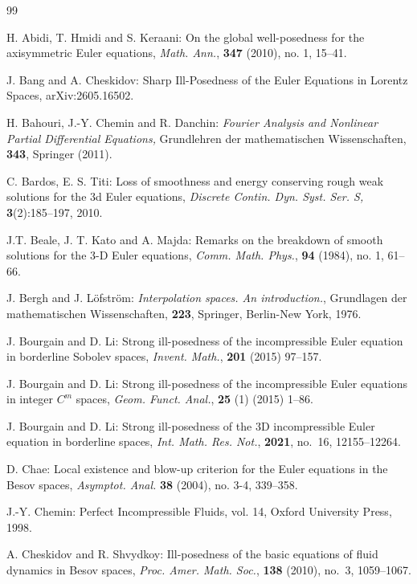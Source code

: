 \documentclass[11pt]{amsart}
\numberwithin{equation}{section}
\begin{document}
 
 \begin{thebibliography}{99}

   
 H. Abidi, T. Hmidi and S. Keraani:
On the global well-posedness for the axisymmetric Euler equations, \emph{Math. Ann.}, {\bf  347} (2010), no. 1, 15--41.   

 J. Bang and A. Cheskidov: {Sharp Ill-Posedness of the Euler Equations in Lorentz Spaces}, arXiv:2605.16502.

 H. Bahouri, J.-Y. Chemin and  R. Danchin: {\it Fourier Analysis and Nonlinear Partial Differential Equations,} Grundlehren der mathematischen Wissenschaften, {\bf 343}, Springer (2011).
 
 C. Bardos,  E. S. Titi:  {Loss of smoothness and energy conserving rough weak solutions for the 3d Euler equations}, \emph{Discrete Contin. Dyn. Syst. Ser. S,} {\bf 3}(2):185--197, 2010.
 	
 J.T. Beale, J. T.  Kato and A. Majda:
Remarks on the breakdown of smooth solutions for the 3-D Euler equations,
\emph{Comm. Math. Phys.}, {\bf 94} (1984), no. 1, 61–66. 
 
   J. Bergh and J. L\"ofstr\"om: \emph{Interpolation spaces. An introduction.},  Grundlagen der mathematischen Wissenschaften,
{\bf 223}, Springer, Berlin-New York,	1976.
 
   J. Bourgain and D. Li: Strong ill-posedness of the incompressible Euler equation in borderline Sobolev spaces,
  \emph{Invent. Math.}, {\bf 201} (2015) 97–157.

 J. Bourgain and D. Li:      Strong ill-posedness of the incompressible Euler equations in integer $C^m$ spaces, 
    \emph{Geom. Funct. Anal.}, {\bf 25} (1) (2015) 1–86. 

 J. Bourgain and D. Li:  Strong ill-posedness of the 3D incompressible Euler equation in borderline spaces, 
\emph{Int. Math. Res. Not.},  {\bf 2021}, no.~16, 12155--12264.

 D. Chae: {Local existence and blow-up criterion for the Euler equations in the Besov spaces},
\emph{Asymptot. Anal.} {\bf 38} (2004), no. 3-4, 339--358.

 J.-Y. Chemin: Perfect Incompressible Fluids, vol. 14, Oxford University Press, 1998. 

 A. Cheskidov and R. Shvydkoy:  Ill-posedness of the basic equations of fluid dynamics in Besov spaces, 
\emph{Proc. Amer. Math. Soc.},  {\bf 138} (2010), no.~3, 1059--1067.


\end{thebibliography}
\end{document}
